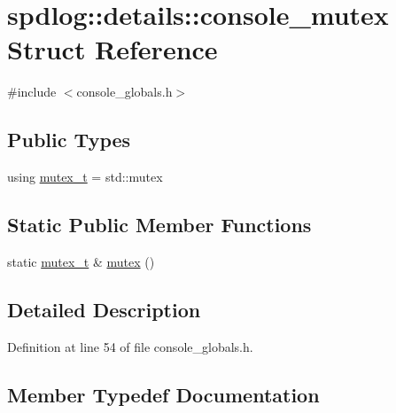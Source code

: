 \hypertarget{structspdlog_1_1details_1_1console__mutex}{}\section{spdlog\+:\+:details\+:\+:console\+\_\+mutex Struct Reference}
\label{structspdlog_1_1details_1_1console__mutex}


{\ttfamily \#include $<$console\+\_\+globals.\+h$>$}

\subsection*{Public Types}
\begin{DoxyCompactItemize}
\item 
using \hyperlink{structspdlog_1_1details_1_1console__mutex_a8c47cc70b6f1c3c7ddda2f919e4fae53}{mutex\+\_\+t} = std\+::mutex
\end{DoxyCompactItemize}
\subsection*{Static Public Member Functions}
\begin{DoxyCompactItemize}
\item 
static \hyperlink{structspdlog_1_1details_1_1console__mutex_a8c47cc70b6f1c3c7ddda2f919e4fae53}{mutex\+\_\+t} \& \hyperlink{structspdlog_1_1details_1_1console__mutex_a0eca5de786748bdfe509966a54b4d32f}{mutex} ()
\end{DoxyCompactItemize}


\subsection{Detailed Description}


Definition at line 54 of file console\+\_\+globals.\+h.



\subsection{Member Typedef Documentation}
\mbox{\label{structspdlog_1_1details_1_1console__mutex_a8c47cc70b6f1c3c7ddda2f919e4fae53}} 
